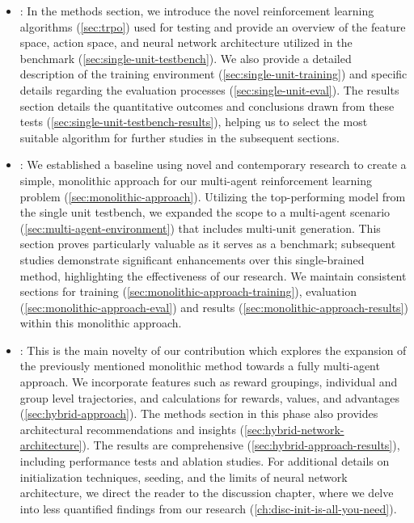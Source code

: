 \begin{itemize}[itemsep=1pt, parsep=0pt]

\item {}: In the methods section, we introduce the novel reinforcement learning algorithms (\autoref{sec:trpo}) used for testing and provide an overview of the feature space, action space, and neural network architecture utilized in the benchmark (\autoref{sec:single-unit-testbench}). We also provide a detailed description of the training environment (\autoref{sec:single-unit-training}) and specific details regarding the evaluation processes (\autoref{sec:single-unit-eval}). The results section details the quantitative outcomes and conclusions drawn from these tests (\autoref{sec:single-unit-testbench-results}), helping us to select the most suitable algorithm for further studies in the subsequent sections.

\item {}: We established a baseline using novel and contemporary research to create a simple, monolithic approach for our multi-agent reinforcement learning problem (\autoref{sec:monolithic-approach}). Utilizing the top-performing model from the single unit testbench, we expanded the scope to a multi-agent scenario (\autoref{sec:multi-agent-environment}) that includes multi-unit generation. This section proves particularly valuable as it serves as a benchmark; subsequent studies demonstrate significant enhancements over this single-brained method, highlighting the effectiveness of our research. We maintain consistent sections for training (\autoref{sec:monolithic-approach-training}), evaluation (\autoref{sec:monolithic-approach-eval}) and results (\autoref{sec:monolithic-approach-results}) within this monolithic approach.

\item {}: This is the main novelty of our contribution which explores the expansion of the previously mentioned monolithic method towards a fully multi-agent approach. We incorporate features such as reward groupings, individual and group level trajectories, and calculations for rewards, values, and advantages (\autoref{sec:hybrid-approach}). The methods section in this phase also provides architectural recommendations and insights (\autoref{sec:hybrid-network-architecture}). The results are comprehensive (\autoref{sec:hybrid-approach-results}), including performance tests and ablation studies. For additional details on initialization techniques, seeding, and the limits of neural network architecture, we direct the reader to the discussion chapter, where we delve into less quantified findings from our research (\autoref{ch:disc-init-is-all-you-need}).

\end{itemize}

